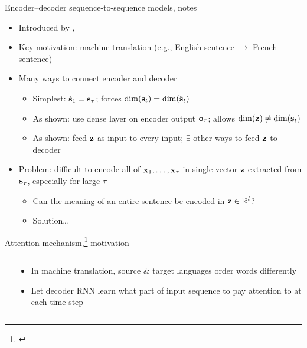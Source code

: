 \begin{frame}{Encoder--decoder sequence-to-sequence models, notes}
    \begin{itemize}[<.->]
        \item<+-> Introduced by \citet{ChoEMNLP14}, \citet{Sutskever14}
        \item Key motivation: machine translation (e.g., English sentence $\to$ French sentence)
        \item<+-> Many ways to connect encoder and decoder
        \begin{itemize}
            \item Simplest: $\hat{\mathbf{s}}_1 = \mathbf{s}_\tau$; forces $\dim(\mathbf{s}_t) = \dim(\hat{\mathbf{s}}_t)$
            \item As shown: use dense layer on encoder output $\mathbf{o}_\tau$; allows $\dim(\mathbf{z}) \ne \dim(\mathbf{s}_t)$
            \item As shown: feed $\mathbf{z}$ as input to every input; $\exists$ other ways to feed $\mathbf{z}$ to decoder
        \end{itemize}
        \item<+-> Problem: difficult to encode all of $\mathbf{x}_1, \dots, \mathbf{x}_\tau$ in single vector $\mathbf{z}$ extracted from $\mathbf{s}_\tau$, especially for large $\tau$
        \begin{itemize}
            \item Can the meaning of an entire sentence be encoded in $\mathbf{z} \in \mathbb{R}^l$?
            \item Solution\ldots
        \end{itemize}
    \end{itemize}
\end{frame}

\setcounter{footnote}{0}

\begin{frame}{Attention mechanism,\footnote{\citet{BahdanauICLR15}} motivation}
    \begin{columns}
        \begin{column}{0.6\textwidth}
            
        \end{column}
        \begin{column}{0.4\textwidth}
            \begin{itemize}
                \item In machine translation, source \& target languages order words differently
                \item Let decoder RNN learn what part of input sequence to pay attention to at each time step
            \end{itemize}
        \end{column}
    \end{columns}
\end{frame}

